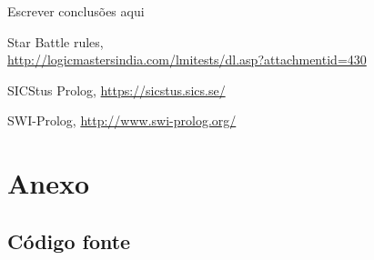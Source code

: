 \documentclass[runningheads,a4paper]{llncs}
\begin{document}
Escrever conclusões aqui


\begin{thebibliography}{4}

 Star Battle rules,\\
\url{http://logicmastersindia.com/lmitests/dl.asp?attachmentid=430}

 SICStus Prolog, \url{https://sicstus.sics.se/}

 SWI-Prolog, \url{http://www.swi-prolog.org/}

\end{thebibliography}


\section*{Anexo}

\subsection*{Código fonte}

\newenvironment{changemargin}[2]{%
\begin{list}{}{%
\setlength{\topsep}{0pt}%
\setlength{\leftmargin}{#1}%
\setlength{\rightmargin}{#2}%
\setlength{\listparindent}{\parindent}%
\setlength{\itemindent}{\parindent}%
\setlength{\parsep}{\parskip}%
}%
\item[]}{
\end{list}}

\medskip
\end{document}
